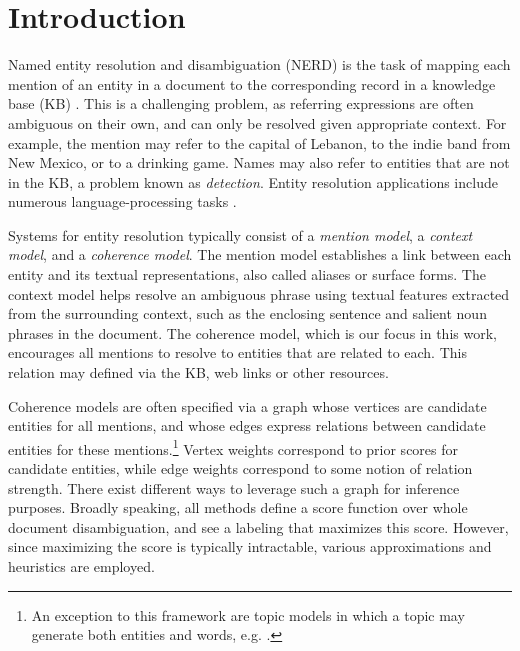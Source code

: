 \section{Introduction}
\label{sec:intro}

Named entity resolution and disambiguation (NERD) is the task of mapping each mention of an entity in a document to the corresponding record in a knowledge base (KB) \cite{BunescuP06,Cucerzan07,KulkarniSRC09,Dredze2010,Hoffart2011,Hachey2013130}.  
This is a challenging problem, as referring expressions are often ambiguous on their own, and can only be resolved given appropriate context. For example, the mention  may refer to the capital of Lebanon, to the indie band from New Mexico, or to a drinking game. Names may also refer to entities that are not in the KB, a problem known as \emph{{\NIL} detection}. 
Entity resolution applications include numerous language-processing tasks  \cite{Gabrilovich2007,Lin2012,finin2009Coreference,mayfield2009cross}. %

Systems for entity resolution typically consist of a \emph{mention model}, a \emph{context model}, and a \emph{coherence model}. The mention model establishes a link between each entity and its textual representations, also called aliases or surface forms. The context model helps resolve an ambiguous phrase using textual features extracted from the surrounding context, such as the enclosing sentence and salient noun phrases in the document. The coherence model, which is our focus in this work, encourages all mentions to resolve to entities that are related to each. This relation may defined via
the KB, web links or other resources. 

Coherence models are often specified via a graph whose vertices are candidate entities for all mentions, and whose edges express relations between candidate entities for these mentions.\footnote{An exception to this framework are topic models in which a topic may generate both entities and words, e.g. \cite{kataria2011,HanS12,houlsby2014scalable}.}  Vertex weights correspond to prior scores for candidate entities, while edge weights correspond to some notion of relation strength. There exist different ways to leverage such a graph for inference purposes. Broadly speaking, all methods define a score function over whole document disambiguation, and see a labeling that maximizes this score. However, since maximizing the score is typically intractable, various approximations and heuristics are employed.

